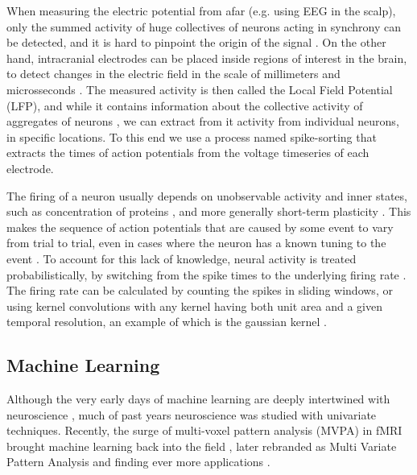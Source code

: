     When measuring the electric potential from afar (e.g. using EEG in the scalp), only the summed activity of huge collectives of neurons acting in synchrony can be detected, and it is hard to pinpoint the origin of the signal \cite{buzsaki2012origin}. On the other hand, intracranial electrodes can be placed inside regions of interest in the brain, to detect changes in the electric field in the scale of millimeters and microsseconds \cite{}. The measured activity is then called the Local Field Potential (LFP), and while it contains information about the collective activity of aggregates of neurons \cite{buzsaki2012origin}, we can extract from it activity from individual neurons, in specific locations. To this end we use a process named spike-sorting \cite{rey2015past} that extracts the times of action potentials from the voltage timeseries of each electrode. 
    
    The firing of a neuron usually depends on unobservable activity and inner states, such as concentration of proteins \cite{}, and more generally short-term plasticity \cite{motanis2018short}. This makes the sequence of action potentials that are caused by some event to vary from trial to trial, even in cases where the neuron has a known tuning to the event \cite[p~7-8]{dayan2001theoretical}. To account for this lack of knowledge, neural activity is treated probabilistically, by switching from the spike times to the underlying firing rate \cite[p~9-11]{dayan2001theoretical}. The firing rate can be calculated by counting the spikes in sliding windows, or using kernel convolutions with any kernel having both unit area and a given temporal resolution, an example of which is the gaussian kernel \cite[p~9-11]{dayan2001theoretical}.
    
    \subsection{Machine Learning}
        Although the very early days of machine learning are deeply intertwined with neuroscience \cite{mcclelland1986parallel}, much of past years neuroscience was studied with univariate techniques. Recently, the surge of multi-voxel pattern analysis (MVPA) in fMRI brought machine learning back into the field \cite{}, later rebranded as Multi Variate Pattern Analysis and finding ever more applications \cite{haxby2012multivariate}. 
        
